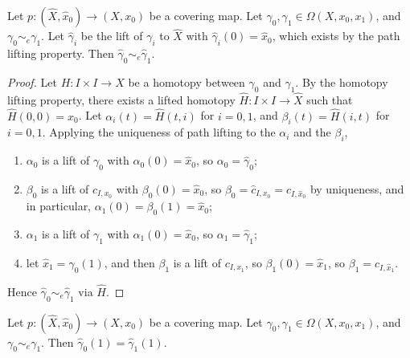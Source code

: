 \begin{proposition}
	Let \( p \colon (\hat X, \hat x_0) \to (X, x_0) \) be a covering map.
	Let \( \gamma_0, \gamma_1 \in \Omega(X,x_0,x_1) \), and \( \gamma_0 \sim_e \gamma_1 \).
	Let \( \hat\gamma_i \) be the lift of \( \gamma_i \) to \( \hat X \) with \( \hat\gamma_i(0) = \hat x_0 \), which exists by the path lifting property.
	Then \( \hat\gamma_0 \sim_e \hat\gamma_1 \).
\end{proposition}
\begin{proof}
	Let \( H \colon I \times I \to X \) be a homotopy between \( \gamma_0 \) and \( \gamma_1 \).
	By the homotopy lifting property, there exists a lifted homotopy \( \hat H \colon I \times I \to \hat X \) such that \( \hat H(0,0) = \hat x_0 \).
	Let \( \alpha_i(t) = \hat H(t,i) \) for \( i = 0, 1 \), and \( \beta_i(t) = \hat H(i,t) \) for \( i = 0, 1 \).
	Applying the uniqueness of path lifting to the \( \alpha_i \) and the \( \beta_i \),
	\begin{enumerate}
		\item \( \alpha_0 \) is a lift of \( \gamma_0 \) with \( \alpha_0(0) = \hat x_0 \), so \( \alpha_0 = \hat\gamma_0 \);
		\item \( \beta_0 \) is a lift of \( c_{I,x_0} \) with \( \beta_0(0) = \hat x_0 \), so \( \beta_0 = \hat c_{I,x_0} = c_{I,\hat x_0} \) by uniqueness, and in particular, \( \alpha_1(0) = \beta_0(1) = \hat x_0 \);
		\item \( \alpha_1 \) is a lift of \( \gamma_1 \) with \( \alpha_1(0) = \hat x_0 \), so \( \alpha_1 = \hat\gamma_1 \);
		\item let \( \hat x_1 = \hat \gamma_0(1) \), and then \( \beta_1 \) is a lift of \( c_{I,x_1} \), so \( \beta_1(0) = \hat x_1 \), so \( \beta_1 = c_{I,\hat x_1} \).
	\end{enumerate}
	Hence \( \hat \gamma_0 \sim_e \hat \gamma_1 \) via \( \hat H \).
\end{proof}
\begin{corollary}
	Let \( p \colon (\hat X, \hat x_0) \to (X, x_0) \) be a covering map.
	Let \( \gamma_0, \gamma_1 \in \Omega(X,x_0,x_1) \), and \( \gamma_0 \sim_e \gamma_1 \).
	Then \( \hat \gamma_0(1) = \hat \gamma_1(1) \).
\end{corollary}

